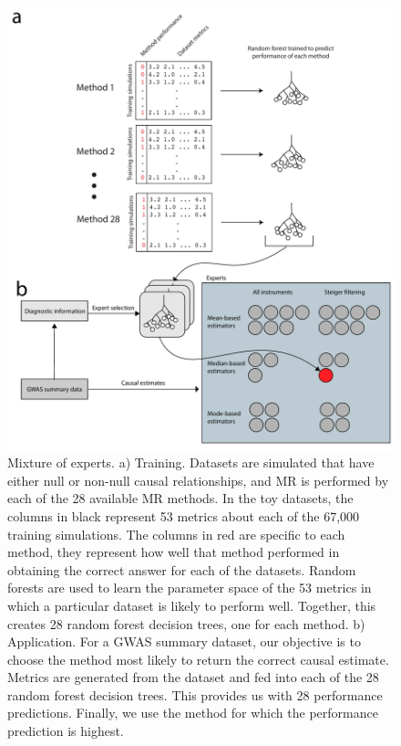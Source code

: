\documentclass[]{article}
\begin{document}
\newpage

\begin{figure}
\centering
\includegraphics{images/fig2.pdf}
\caption{Mixture of experts. a) Training. Datasets are simulated that
have either null or non-null causal relationships, and MR is performed
by each of the 28 available MR methods. In the toy datasets, the columns
in black represent 53 metrics about each of the 67,000 training
simulations. The columns in red are specific to each method, they
represent how well that method performed in obtaining the correct answer
for each of the datasets. Random forests are used to learn the parameter
space of the 53 metrics in which a particular dataset is likely to
perform well. Together, this creates 28 random forest decision trees,
one for each method. b) Application. For a GWAS summary dataset, our
objective is to choose the method most likely to return the correct
causal estimate. Metrics are generated from the dataset and fed into
each of the 28 random forest decision trees. This provides us with 28
performance predictions. Finally, we use the method for which the
performance prediction is highest.}
\end{figure}
\end{document}
